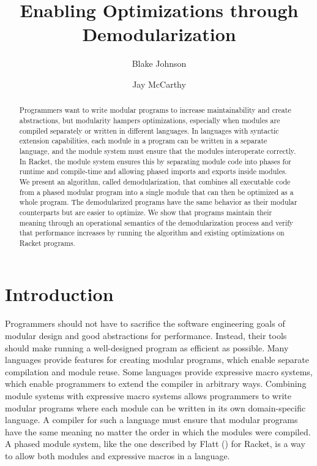 \documentclass{llncs}
\begin{document}
\title{Enabling Optimizations through Demodularization} 
\author{Blake Johnson \and Jay McCarthy}
\maketitle
\begin{abstract}
Programmers want to write modular programs to increase maintainability and create abstractions, but modularity hampers optimizations, especially when modules are compiled separately or written in different languages. 
In languages with syntactic extension capabilities, each module in a program can be written in a separate language, and the module system must ensure that the modules interoperate correctly. 
In Racket, the module system ensures this by separating module code into phases for runtime and compile-time and allowing phased imports and exports inside modules. 
We present an algorithm, called demodularization, that combines all executable code from a phased modular program into a single module that can then be optimized as a whole program. 
The demodularized programs have the same behavior as their modular counterparts but are easier to optimize. 
We show that programs maintain their meaning through an operational semantics of the demodularization process and verify that performance increases by running the algorithm and existing optimizations on Racket programs.
\end{abstract}

\section{Introduction}

Programmers should not have to sacrifice the software engineering goals of modular design and good abstractions for performance. 
Instead, their tools should make running a well-designed program as efficient as possible. 
Many languages provide features for creating modular programs, which enable separate compilation and module reuse.
Some languages provide expressive macro systems, which enable programmers to extend the compiler in arbitrary ways.
Combining module systems with expressive macro systems allows programmers to write modular programs where each module can be written in its own domain-specific language.
A compiler for such a language must ensure that modular programs have the same meaning no matter the order in which the modules were compiled.
A phased module system, like the one described by Flatt () for Racket, is a way to allow both modules and expressive macros in a language.
\end{document}
